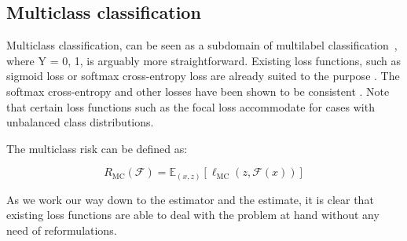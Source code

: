 \subsection{Multiclass classification}
\label{section:background:multiclassClassification}

Multiclass classification, can be seen as a subdomain of multilabel classification~\citep{multilabelReduction}, where Y = {0, 1}, is arguably more straightforward. Existing loss functions, such as sigmoid loss or softmax cross-entropy loss are already suited to the purpose . The softmax cross-entropy and other losses have been shown to be consistent \cite{consistency-multiclassSVM, consistency-lossAnalysis, consistency-surrogates}. Note that certain loss functions such as the focal loss accommodate for cases with unbalanced class distributions. 

The multiclass risk can be defined as:

\begin{equation}
R_{\mathrm{MC}}(\mathcal{F}) = \mathbb{E}_{(x, z)}\left[\ell_{\mathrm{MC}}(z, \mathcal{F}(x))\right]
\end{equation}

As we work our way down to the estimator and the estimate, it is clear that existing loss functions are able to deal with the problem at hand without any need of reformulations. 

\cite{multiclassToBinary1}



